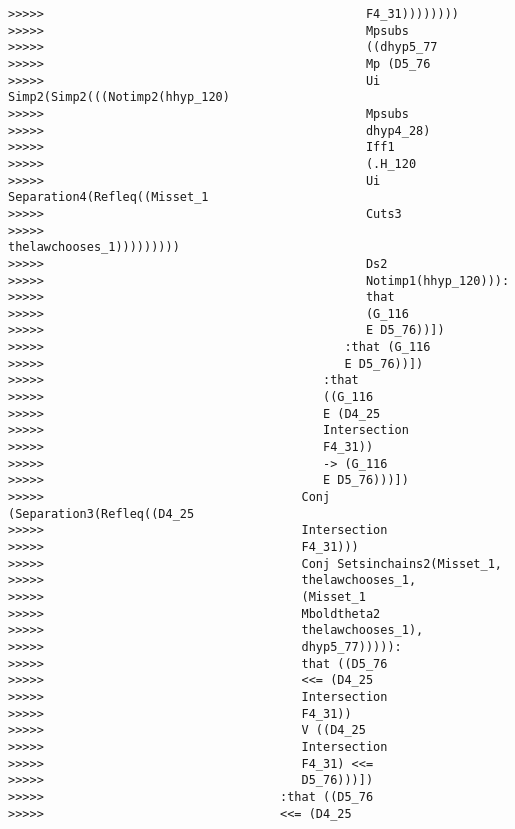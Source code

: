 \documentclass[12pt]{article}
\begin{document}
\begin{verbatim}
>>>>>                                             F4_31))))))))
>>>>>                                             Mpsubs
>>>>>                                             ((dhyp5_77
>>>>>                                             Mp (D5_76
>>>>>                                             Ui Simp2(Simp2(((Notimp2(hhyp_120)
>>>>>                                             Mpsubs
>>>>>                                             dhyp4_28)
>>>>>                                             Iff1
>>>>>                                             (.H_120
>>>>>                                             Ui Separation4(Refleq((Misset_1
>>>>>                                             Cuts3
>>>>>                                             thelawchooses_1)))))))))
>>>>>                                             Ds2
>>>>>                                             Notimp1(hhyp_120))):
>>>>>                                             that
>>>>>                                             (G_116
>>>>>                                             E D5_76))])
>>>>>                                          :that (G_116
>>>>>                                          E D5_76))])
>>>>>                                       :that
>>>>>                                       ((G_116
>>>>>                                       E (D4_25
>>>>>                                       Intersection
>>>>>                                       F4_31))
>>>>>                                       -> (G_116
>>>>>                                       E D5_76)))])
>>>>>                                    Conj (Separation3(Refleq((D4_25
>>>>>                                    Intersection
>>>>>                                    F4_31)))
>>>>>                                    Conj Setsinchains2(Misset_1,
>>>>>                                    thelawchooses_1,
>>>>>                                    (Misset_1
>>>>>                                    Mboldtheta2
>>>>>                                    thelawchooses_1),
>>>>>                                    dhyp5_77))))):
>>>>>                                    that ((D5_76
>>>>>                                    <<= (D4_25
>>>>>                                    Intersection
>>>>>                                    F4_31))
>>>>>                                    V ((D4_25
>>>>>                                    Intersection
>>>>>                                    F4_31) <<=
>>>>>                                    D5_76)))])
>>>>>                                 :that ((D5_76
>>>>>                                 <<= (D4_25

\end{verbatim}
\end{document}
